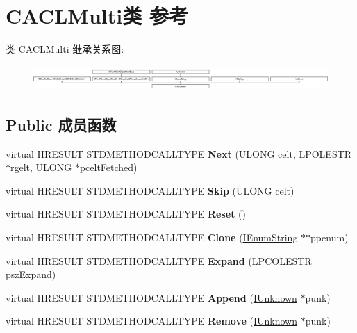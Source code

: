 \hypertarget{class_c_a_c_l_multi}{}\section{C\+A\+C\+L\+Multi类 参考}
\label{class_c_a_c_l_multi}
类 C\+A\+C\+L\+Multi 继承关系图\+:\begin{figure}[H]
\begin{center}
\leavevmode
\includegraphics[height=0.954545cm]{class_c_a_c_l_multi}
\end{center}
\end{figure}
\subsection*{Public 成员函数}
\begin{DoxyCompactItemize}
\item 
\mbox{\label{class_c_a_c_l_multi_af6e5a24f6d5cd134a2a2914adc98656c}} 
virtual H\+R\+E\+S\+U\+LT S\+T\+D\+M\+E\+T\+H\+O\+D\+C\+A\+L\+L\+T\+Y\+PE {\bfseries Next} (U\+L\+O\+NG celt, L\+P\+O\+L\+E\+S\+TR $\ast$rgelt, U\+L\+O\+NG $\ast$pcelt\+Fetched)
\item 
\mbox{\label{class_c_a_c_l_multi_ad5d3c060a2b53923cc051eb5a94bb1d6}} 
virtual H\+R\+E\+S\+U\+LT S\+T\+D\+M\+E\+T\+H\+O\+D\+C\+A\+L\+L\+T\+Y\+PE {\bfseries Skip} (U\+L\+O\+NG celt)
\item 
\mbox{\label{class_c_a_c_l_multi_ab547ea5a3b452f44c50d4873f52fc260}} 
virtual H\+R\+E\+S\+U\+LT S\+T\+D\+M\+E\+T\+H\+O\+D\+C\+A\+L\+L\+T\+Y\+PE {\bfseries Reset} ()
\item 
\mbox{\label{class_c_a_c_l_multi_a13a2b779b02900921c6e5fcb47294661}} 
virtual H\+R\+E\+S\+U\+LT S\+T\+D\+M\+E\+T\+H\+O\+D\+C\+A\+L\+L\+T\+Y\+PE {\bfseries Clone} (\hyperlink{interface_i_enum_string}{I\+Enum\+String} $\ast$$\ast$ppenum)
\item 
\mbox{\label{class_c_a_c_l_multi_adea51649572da865ee9dc9f635d1d401}} 
virtual H\+R\+E\+S\+U\+LT S\+T\+D\+M\+E\+T\+H\+O\+D\+C\+A\+L\+L\+T\+Y\+PE {\bfseries Expand} (L\+P\+C\+O\+L\+E\+S\+TR psz\+Expand)
\item 
\mbox{\label{class_c_a_c_l_multi_a0c0cc3350fd00864a618d8c0fba39d82}} 
virtual H\+R\+E\+S\+U\+LT S\+T\+D\+M\+E\+T\+H\+O\+D\+C\+A\+L\+L\+T\+Y\+PE {\bfseries Append} (\hyperlink{interface_i_unknown}{I\+Unknown} $\ast$punk)
\item 
\mbox{\label{class_c_a_c_l_multi_a87cbbd7b9de289078be4c6d72109467c}} 
virtual H\+R\+E\+S\+U\+LT S\+T\+D\+M\+E\+T\+H\+O\+D\+C\+A\+L\+L\+T\+Y\+PE {\bfseries Remove} (\hyperlink{interface_i_unknown}{I\+Unknown} $\ast$punk)
\end{DoxyCompactItemize}
